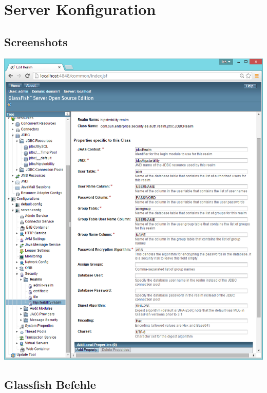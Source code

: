 \section{Server Konfiguration}
\subsection*{Screenshots}
\begin{minipage}[t]{\textwidth}
	\includegraphics[width = \linewidth]{img/screenshot_realm.png}
	\label{fig:realm_screenshot}
\end{minipage}

\newpage
\subsection*{Glassfish Befehle}


